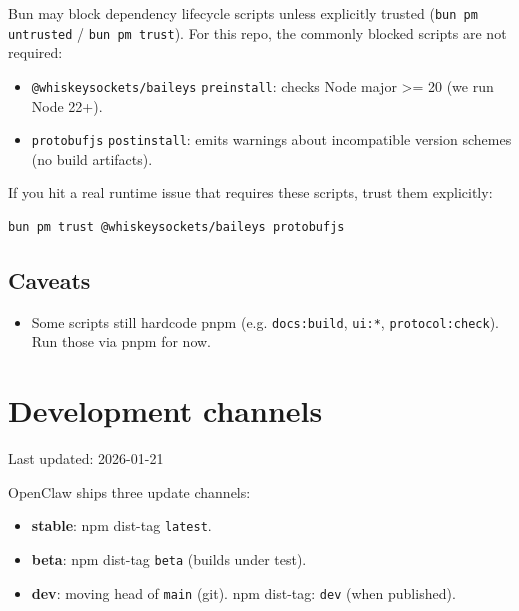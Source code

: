 Bun may block dependency lifecycle scripts unless explicitly trusted (\texttt{bun pm untrusted} / \texttt{bun pm trust}).
For this repo, the commonly blocked scripts are not required:

\begin{itemize}
  \item \texttt{@whiskeysockets/baileys} \texttt{preinstall}: checks Node major >= 20 (we run Node 22+).
  \item \texttt{protobufjs} \texttt{postinstall}: emits warnings about incompatible version schemes (no build artifacts).
\end{itemize}


If you hit a real runtime issue that requires these scripts, trust them explicitly:

\begin{lstlisting}[language=bash]
bun pm trust @whiskeysockets/baileys protobufjs
\end{lstlisting}


\subsection{Caveats}


\begin{itemize}
  \item Some scripts still hardcode pnpm (e.g. \texttt{docs:build}, \texttt{ui:*}, \texttt{protocol:check}). Run those via pnpm for now.
\end{itemize}



\clearpage

\section{Development channels}


Last updated: 2026-01-21

OpenClaw ships three update channels:

\begin{itemize}
  \item \textbf{stable}: npm dist-tag \texttt{latest}.
  \item \textbf{beta}: npm dist-tag \texttt{beta} (builds under test).
  \item \textbf{dev}: moving head of \texttt{main} (git). npm dist-tag: \texttt{dev} (when published).
\end{itemize}


